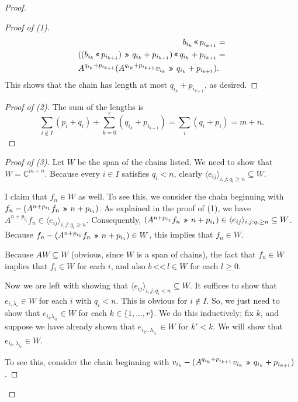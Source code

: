 \documentclass[12pt,psamsfonts]{article}
\newcommand{\leftshift}{\,\texttt{<<}\,}
\newcommand{\rightshift}{\mathbin{\rotatebox[origin=c]{180}{\leftshift}}}
\begin{document}
\begin{proof}
\begin{proof}[Proof of (1)]
\begin{align*}
            b_{i_k} \leftshift p_{i_{k + 1}} & = \\
            ((b_{i_k} \leftshift p_{i_{k + 1}}) \rightshift q_{i_k} + p_{i_{k + 1}}) \leftshift q_{i_k} + p_{i_{k + 1}} & = \\
            A^{q_{i_k} + p_{i_{k + 1}}}(A^{q_{i_k} + p_{i_{k + 1}}} v_{i_k} \rightshift q_{i_k} + p_{i_{k + 1}}) & .
        \end{align*}
        This shows that the chain has length at most \(q_{i_k} + p_{i_{k + 1}}\), as desired.
    \end{proof}
    \begin{proof}[Proof of (2)]
        The sum of the lengths is
        \[\sum_{i \notin I} (p_i + q_i) + \sum_{k = 0}^r (q_{i_k} + p_{i_{k + 1}}) = \sum_i (q_i + p_i) = m + n.\]
    \end{proof}
    \begin{proof}[Proof of (3)]
        Let \(W\) be the span of the chains listed.
        We need to show that \(W = \mathbb{C}^{m + n}\).
        Because every \(i \in I\) satisfies \(q_i < n\), clearly \(\langle e_{ij}\rangle_{i,j : q_i \geq n} \subseteq W\).
        \par I claim that \(f_n \in W\) as well.
        To see this, we consider the chain beginning with \(f_n - (A^{n + p_{i_1}} f_n \rightshift n + p_{i_1})\).
        As explained in the proof of (1), we have \(A^{n + p_{i_1}} f_n \in \langle e_{ij}\rangle_{i,j : q_i \geq n}\).
        Consequently, \((A^{n + p_{i_1}} f_n \rightshift n + p_{i_1}) \in \langle e_{ij} \rangle_{i,j : q_i \geq n} \subseteq W\).
        Because \(f_n - (A^{n + p_{i_1}} f_n \rightshift n + p_{i_1}) \in W\), this implies that \(f_n \in W\).
        \par Because \(AW \subseteq W\) (obvious, since \(W\) is a span of chains), the fact that \(f_n \in W\) implies that \(f_i \in W\) for each \(i\), and also \(b \leftshift l \in W\) for each \(l \geq 0\).
        \par Now we are left with showing that \(\langle e_{ij} \rangle_{i,j : q_i < n} \subseteq W\).
        It suffices to show that \(e_{i, \lambda_i} \in W\) for each \(i\) with \(q_i < n\).
        This is obvious for \(i \notin I\).
        So, we just need to show that \(e_{i_k\lambda_{i_k}} \in W\) for each \(k \in \{1, ..., r\}\).
        We do this inductively; fix \(k\), and suppose we have already shown that \(e_{i_{k'}, \lambda_{i_{k'}}} \in W\) for \(k' < k\).
        We will show that \(e_{i_k, \lambda_{i_k}} \in W\).
        \par To see this, consider the chain beginning with \(v_{i_k} - (A^{q_{i_k} + p_{i_{k + 1}}} v_{i_k} \rightshift q_{i_k} + p_{i_{k + 1}})\).

\end{proof}
\end{proof}
\end{document}
